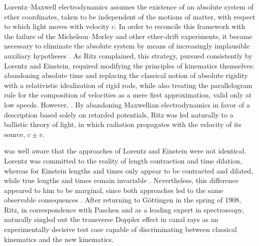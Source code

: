 \documentclass[submitted,12pt]{article}
\begin{document}
Lorentz--Maxwell electrodynamics assumes the existence of an absolute system of ether coordinates, taken to be independent of the motions of matter, with respect to which light moves with velocity $c$. In order to reconcile this framework with the failure of the Michelson--Morley and other ether-drift experiments, it became necessary to eliminate the absolute system by means of increasingly implausible auxiliary hypotheses \citep[148]{Ritz1908a}. As Ritz complained, this strategy, pursued consistently by Lorentz and Einstein, required modifying the principles of kinematics themselves: abandoning absolute time and replacing the classical notion of absolute rigidity with a relativistic idealization of rigid rods, while also treating the parallelogram rule for the composition of velocities as a mere first approximation, valid only at low speeds. However,  \citep[148]{Ritz1908a}. By abandoning Maxwellian electrodynamics in favor of a description based solely on retarded potentials, Ritz was led naturally to a ballistic theory of light, in which radiation propagates with the velocity of its source, $c \pm v$.


\citet[203]{Ritz1908} was well aware that the approaches of Lorentz and Einstein were not identical. Lorentz was committed to the reality  of length contraction and time dilation, whereas for Einstein lengths and times only appear  to be contracted and dilated, while true lengths and times remain invariable \citep[203]{Ritz1908}. Nevertheless, this difference appeared to him to be marginal, since both approaches led to the same observable consequences \citep[213]{Ritz1908b}. After returning to Göttingen in the spring of 1908, Ritz, in correspondence with Paschen and as a leading expert in spectroscopy, naturally singled out the transverse Doppler effect in canal rays as an experimentally decisive test case capable of discriminating between classical kinematics and the new kinematics.
\end{document}
